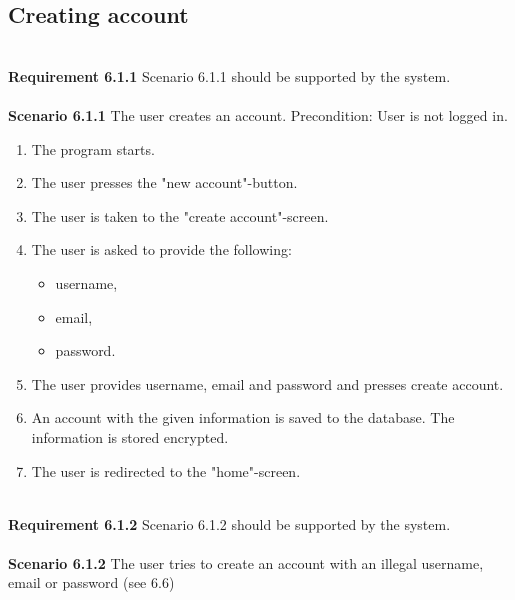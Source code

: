 \documentclass{article}
\begin{document}
\subsection{Creating account}
\mbox{}\\
\textbf{Requirement 6.1.1} Scenario 6.1.1 should be supported by the system.
\\ \\
\textbf{Scenario 6.1.1} The user creates an account. Precondition: User is not logged in. 
\begin{enumerate}
    \item The program starts.
    \item The user presses the "new account"-button. 
    \item The user is taken to the "create account"-screen.
    \item The user is asked to provide the following:
        \begin{itemize}
            \item username,
            \item email,
            \item password.
        \end{itemize}
    \item The user provides username, email and password and presses create account.
    \item An account with the given information is saved to the database. The information is stored encrypted.
    \item The user is redirected to the "home"-screen.
\end{enumerate}
\mbox{}\\
\textbf{Requirement 6.1.2} Scenario 6.1.2 should be supported by the system.
\\ \\
\textbf{Scenario 6.1.2} The user tries to create an account with an illegal username, email or password (see 6.6)
\end{document}
